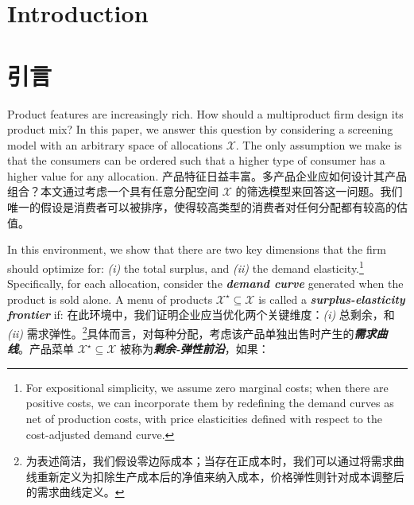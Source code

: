 \documentclass[12pt,letterpaper]{article}
\newenvironment{original}{\color{black}\noindent}{}
\newenvironment{translation}{\color{blue}\noindent}{}
\theoremstyle{plain}
\theoremstyle{definition}
\theoremstyle{remark}
\renewcommand{\1}{\mathds{1}}
\theoremstyle{definition}
\begin{document}
\newpage

\begin{original}
\section{Introduction}
\end{original}
\begin{translation}
\section{引言}
\end{translation}

\begin{original}
Product features are increasingly rich. How should a multiproduct firm design its product mix? In this paper, we answer this question by considering a screening model with an arbitrary space of allocations $\mathcal{X}$. The only assumption we make is that the consumers can be ordered such that a higher type of consumer has a higher value for any allocation.
\end{original}
\begin{translation}
产品特征日益丰富。多产品企业应如何设计其产品组合？本文通过考虑一个具有任意分配空间 $\mathcal{X}$ 的筛选模型来回答这一问题。我们唯一的假设是消费者可以被排序，使得较高类型的消费者对任何分配都有较高的估值。
\end{translation}

\begin{original}
In this environment, we show that there are two key dimensions that the firm should optimize for: \textit{(i)} the total surplus, and \textit{(ii)} the demand elasticity.\footnote{For expositional simplicity, we assume zero marginal costs; when there are positive costs, we can incorporate them by redefining the demand curves as net of production costs, with price elasticities defined with respect to the cost-adjusted demand curve.} Specifically, for each allocation, consider the \textit{\textbf{demand curve}} generated when the product is sold alone.  A menu of products $\mathcal{X}^\star \subseteq \mathcal{X}$ is called a \textit{\textbf{surplus-elasticity frontier}} if:
\end{original}
\begin{translation}
在此环境中，我们证明企业应当优化两个关键维度：\textit{(i)} 总剩余，和\textit{(ii)} 需求弹性。\footnote{为表述简洁，我们假设零边际成本；当存在正成本时，我们可以通过将需求曲线重新定义为扣除生产成本后的净值来纳入成本，价格弹性则针对成本调整后的需求曲线定义。}具体而言，对每种分配，考虑该产品单独出售时产生的\textit{\textbf{需求曲线}}。产品菜单 $\mathcal{X}^\star \subseteq \mathcal{X}$ 被称为\textit{\textbf{剩余-弹性前沿}}，如果：
\end{translation}
\end{document}
